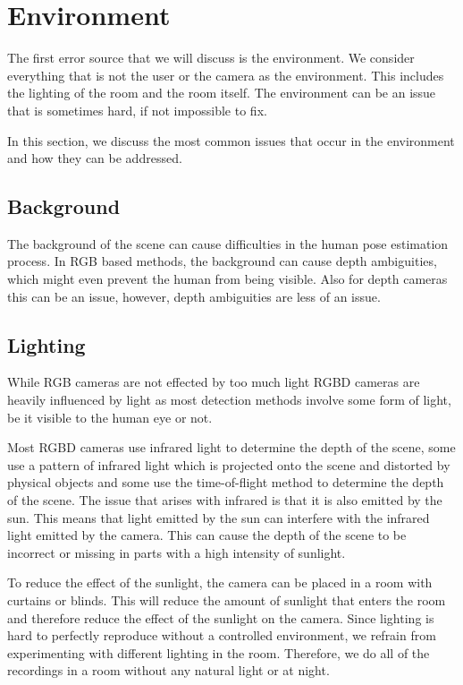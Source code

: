 \section{Environment}

The first error source that we will discuss is the environment. We consider everything that is not the user or the camera as the environment. This includes the lighting of the room and the room itself. The environment can be an issue that is sometimes hard, if not impossible to fix. 

In this section, we discuss the most common issues that occur in the environment and how they can be addressed.

\subsection{Background}

The background of the scene can cause difficulties in the human pose estimation process. In RGB based methods, the background can cause depth ambiguities, which might even prevent the human from being visible. Also for depth cameras this can be an issue, however, depth ambiguities are less of an issue.

\subsection{Lighting}

While RGB cameras are not effected by too much light RGBD cameras are heavily influenced by light as most detection methods involve some form of light, be it visible to the human eye or not.

Most RGBD cameras use infrared light to determine the depth of the scene, some use a pattern of infrared light which is projected onto the scene and distorted by physical objects and some use the time-of-flight method to determine the depth of the scene. The issue that arises with infrared is that it is also emitted by the sun. This means that light emitted by the sun can interfere with the infrared light emitted by the camera. This can cause the depth of the scene to be incorrect or missing in parts with a high intensity of sunlight.

To reduce the effect of the sunlight, the camera can be placed in a room with curtains or blinds. This will reduce the amount of sunlight that enters the room and therefore reduce the effect of the sunlight on the camera. Since lighting is hard to perfectly reproduce without a controlled environment, we refrain from experimenting with different lighting in the room. Therefore, we do all of the recordings in a room without any natural light or at night.

